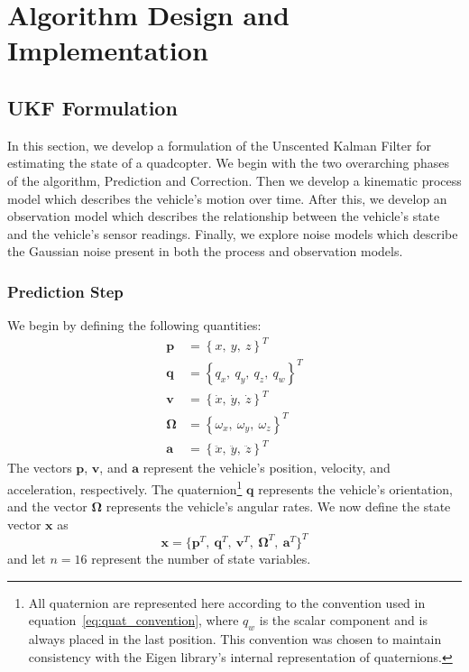 \chapter{Algorithm Design and Implementation} \label{ch:Alg_Design}

\section{UKF Formulation} \label{sec:ukf_formulation}

In this section, we develop a formulation of the Unscented Kalman Filter for estimating the state of a quadcopter. We begin with the two overarching phases of the algorithm, Prediction and Correction. Then we develop a kinematic process model which describes the vehicle's motion over time. After this, we develop an observation model which describes the relationship between the vehicle's state and the vehicle's sensor readings. Finally, we explore noise models which describe the Gaussian noise present in both the process and observation models.

\subsection{Prediction Step}

We begin by defining the following quantities:
%
\begin{align} \label{eq:state_vars}
\mathbf{p} &= \left\lbrace x,\ y,\ z \right\rbrace ^{T} \\
\mathbf{q} &= \left\lbrace q_{x},\ q_{y},\ q_{z},\ q_{w} \right\rbrace ^{T} \label{eq:quat_convention} \\
\mathbf{v} &= \left\lbrace \dot{x},\ \dot{y},\ \dot{z} \right\rbrace ^{T} \\
\bm{\Omega} &= \left\lbrace \omega_{x},\ \omega_{y},\ \omega_{z} \right\rbrace ^{T} \\
\mathbf{a} &= \left\lbrace \ddot{x},\ \ddot{y},\ \ddot{z} \right\rbrace ^{T}
\end{align}
%
The vectors $\mathbf{p}$, $\mathbf{v}$, and $\mathbf{a}$ represent the vehicle's position, velocity, and acceleration, respectively. The quaternion\footnote{All quaternion are represented here according to the convention used in equation~\ref{eq:quat_convention}, where $q_{w}$ is the scalar component and is always placed in the last position. This convention was chosen to maintain consistency with the Eigen library's internal representation of quaternions.} $\mathbf{q}$ represents the vehicle's orientation, and the vector $\bm{\Omega}$ represents the vehicle's angular rates. We now define the state vector $\mathbf{x}$ as
%
\begin{equation}
\mathbf{x} = 
\Big\{
    \mathbf{p}^{T},\
    \mathbf{q}^{T},\
    \mathbf{v}^{T},\
    \bm{\Omega}^{T},\
    \mathbf{a}^{T}
\Big\} ^{T}
\end{equation}
%
and let $n = 16$ represent the number of state variables.

